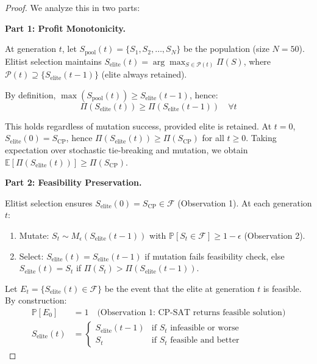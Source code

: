 \begin{proof}
We analyze this in two parts:

\textbf{Part 1: Profit Monotonicity.}

At generation $t$, let $S_{\text{pool}}(t) = \{S_1, S_2, \ldots, S_N\}$ be the population (size $N = 50$). Elitist selection maintains $S_{\text{elite}}(t) = \arg\max_{S \in \mathcal{P}(t)} \Pi(S)$, where $\mathcal{P}(t) \supseteq \{S_{\text{elite}}(t-1)\}$ (elite always retained).

By definition, $\max(S_{\text{pool}}(t)) \geq S_{\text{elite}}(t-1)$, hence:
\begin{equation}
\Pi(S_{\text{elite}}(t)) \geq \Pi(S_{\text{elite}}(t-1)) \quad \forall t
\end{equation}

This holds regardless of mutation success, provided elite is retained. At $t=0$, $S_{\text{elite}}(0) = S_{\text{CP}}$, hence $\Pi(S_{\text{elite}}(t)) \geq \Pi(S_{\text{CP}})$ for all $t \geq 0$. Taking expectation over stochastic tie-breaking and mutation, we obtain $\mathbb{E}[\Pi(S_{\text{elite}}(t))] \geq \Pi(S_{\text{CP}})$.

\textbf{Part 2: Feasibility Preservation.}

Elitist selection ensures $S_{\text{elite}}(0) = S_{\text{CP}} \in \mathcal{F}$ (Observation 1). At each generation $t$:
\begin{enumerate}
\item Mutate: $S_t \sim M_\epsilon(S_{\text{elite}}(t-1))$ with $\mathbb{P}[S_t \in \mathcal{F}] \geq 1 - \epsilon$ (Observation 2).
\item Select: $S_{\text{elite}}(t) = S_{\text{elite}}(t-1)$ if mutation fails feasibility check, else $S_{\text{elite}}(t) = S_t$ if $\Pi(S_t) > \Pi(S_{\text{elite}}(t-1))$.
\end{enumerate}

Let $E_t = \{S_{\text{elite}}(t) \in \mathcal{F}\}$ be the event that the elite at generation $t$ is feasible. By construction:
\begin{align}
\mathbb{P}[E_0] &= 1 \quad \text{(Observation 1: CP-SAT returns feasible solution)}\\
S_{\text{elite}}(t) &= \begin{cases} S_{\text{elite}}(t-1) & \text{if } S_t \text{ infeasible or worse} \\ S_t & \text{if } S_t \text{ feasible and better} \end{cases}
\end{align}


\end{proof}
